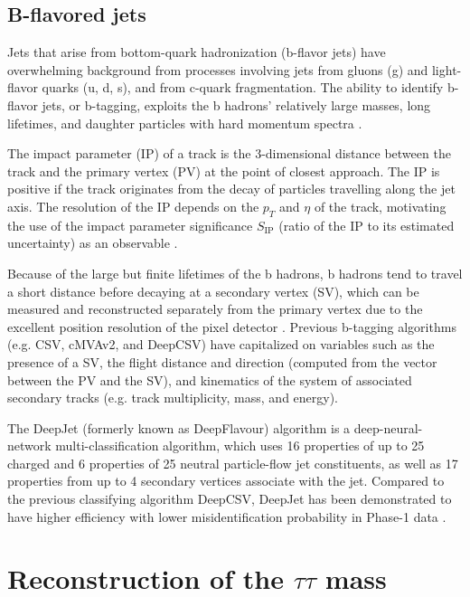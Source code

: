 \subsection{B-flavored jets}
Jets that arise from bottom-quark hadronization (b-flavor jets) have overwhelming background from processes involving jets from gluons (g) and light-flavor quarks (u, d, s), and from c-quark fragmentation. The ability to identify b-flavor jets, or b-tagging, exploits the b hadrons' relatively large masses, long lifetimes, and daughter particles with hard momentum spectra \cite{CMS-BTV-12-001}. 

The impact parameter (IP) of a track is the 3-dimensional distance between the track and the primary vertex (PV) at the point of closest approach. The IP is positive if the track originates from the decay of particles travelling along the jet axis. The resolution of the IP depends on the $p_{T}$ and $\eta$ of the track, motivating the use of the impact parameter significance $S_{\text{IP}}$ (ratio of the IP to its estimated uncertainty) as an observable \cite{CMS-BTV-12-001}.

Because of the large but finite lifetimes of the b hadrons, b hadrons tend to travel a short distance before decaying at a secondary vertex (SV), which can be measured and reconstructed separately from the primary vertex due to the excellent position resolution of the pixel detector \cite{CMS-BTV-12-001}. Previous b-tagging algorithms (e.g. CSV, cMVAv2, and DeepCSV) have capitalized on variables such as the presence of a SV, the flight distance and direction (computed from the vector between the PV and the SV), and kinematics of the system of associated secondary tracks (e.g. track multiplicity, mass, and energy). 

The DeepJet (formerly known as DeepFlavour) algorithm \cite{CMS-DP-2017-013} is a deep-neural-network multi-classification algorithm, which uses 16 properties of up to 25 charged and 6 properties of 25 neutral particle-flow jet constituents, as well as 17 properties from up to 4 secondary vertices associate with the jet. Compared to the previous classifying algorithm DeepCSV, DeepJet has been demonstrated to have higher efficiency with lower misidentification probability in Phase-1 data \cite{CMS-DP-2018-058}. 



\section{Reconstruction of the \texorpdfstring{$\tau\tau$}{tautau} mass}
\label{section:svfit}

